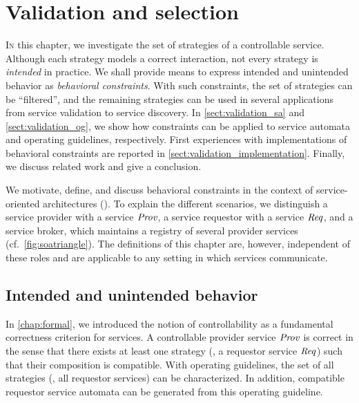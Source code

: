 \chapter{Validation and selection}%
\label{chap:validation}%


\lettrine[findent=.2em,lines=2,nindent=0pt]{I}{n} this chapter, we investigate the set of strategies of a controllable service. Although each strategy models a correct interaction, not every strategy is \emph{intended} in practice. We shall provide means to express intended and unintended behavior as \emph{behavioral constraints}. With such constraints, the set of strategies can be ``filtered'', and the remaining strategies can be used in several applications from service validation to service discovery. In \autoref{sect:validation_sa} and \autoref{sect:validation_og}, we show how constraints can be applied to service automata and operating guidelines, respectively. First experiences with implementations of behavioral constraints are reported in \autoref{sect:validation_implementation}. Finally, we discuss related work and give a conclusion.

%
%
We motivate, define, and discuss behavioral constraints in the context of service-oriented architectures (). To explain the different scenarios, we distinguish a service provider with a service $\mathit{Prov}$, a service requestor with a service $\mathit{Req}$, and a service broker, which maintains a registry of several provider services (cf.~\autoref{fig:soatriangle}). The definitions of this chapter are, however, independent of these roles and are applicable to any setting in which services communicate.





\section{Intended and unintended behavior}

In \autoref{chap:formal}, we introduced the notion of controllability as a fundamental correctness criterion for services. A controllable provider service $\mathit{Prov}$ is correct in the sense that there exists at least one strategy (\ie, a requestor service $\mathit{Req}$) such that their composition is compatible. With operating guidelines, the set of all strategies (\ie, all requestor services) can be characterized. In addition, compatible requestor service automata can be generated from this operating guideline.

